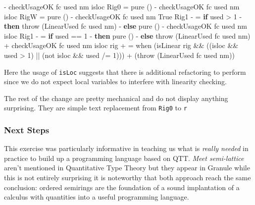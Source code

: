 \documentclass[
]{article}
\newenvironment{Shaded}{}{}
\newcommand{\DataTypeTok}[1]{\textcolor[rgb]{0.56,0.13,0.00}{#1}}
\newcommand{\DecValTok}[1]{\textcolor[rgb]{0.25,0.63,0.44}{#1}}
\newcommand{\FunctionTok}[1]{\textcolor[rgb]{0.02,0.16,0.49}{#1}}
\newcommand{\KeywordTok}[1]{\textcolor[rgb]{0.00,0.44,0.13}{\textbf{#1}}}
\newcommand{\NormalTok}[1]{#1}
\newcommand{\OperatorTok}[1]{\textcolor[rgb]{0.40,0.40,0.40}{#1}}
\newcommand{\OtherTok}[1]{\textcolor[rgb]{0.00,0.44,0.13}{#1}}
\begin{document}
\begin{Shaded}
\begin{Highlighting}[]
\OperatorTok{{-}}\NormalTok{       checkUsageOK fc used nm isloc }\DataTypeTok{Rig0} \OtherTok{=} \FunctionTok{pure}\NormalTok{ ()}
\OperatorTok{{-}}\NormalTok{       checkUsageOK fc used nm isloc }\DataTypeTok{RigW} \OtherTok{=} \FunctionTok{pure}\NormalTok{ ()}
\OperatorTok{{-}}\NormalTok{       checkUsageOK fc used nm }\DataTypeTok{True} \DataTypeTok{Rig1}
\OperatorTok{{-}}           \OtherTok{=} \KeywordTok{if}\NormalTok{ used }\OperatorTok{\textgreater{}} \DecValTok{1}
\OperatorTok{{-}}                \KeywordTok{then}\NormalTok{ throw (}\DataTypeTok{LinearUsed}\NormalTok{ fc used nm)}
\OperatorTok{{-}}                \KeywordTok{else} \FunctionTok{pure}\NormalTok{ ()}
\OperatorTok{{-}}\NormalTok{       checkUsageOK fc used nm isloc }\DataTypeTok{Rig1}
\OperatorTok{{-}}           \OtherTok{=} \KeywordTok{if}\NormalTok{ used }\OperatorTok{==} \DecValTok{1}
\OperatorTok{{-}}                \KeywordTok{then} \FunctionTok{pure}\NormalTok{ ()}
\OperatorTok{{-}}                \KeywordTok{else}\NormalTok{ throw (}\DataTypeTok{LinearUsed}\NormalTok{ fc used nm)}
\OperatorTok{+}\NormalTok{       checkUsageOK fc used nm isloc rig}
\OperatorTok{+}           \OtherTok{=}\NormalTok{ when (isLinear rig }\OperatorTok{\&\&}\NormalTok{ ((isloc }\OperatorTok{\&\&}\NormalTok{ used }\OperatorTok{\textgreater{}} \DecValTok{1}\NormalTok{) }\OperatorTok{||}\NormalTok{ (}\FunctionTok{not}\NormalTok{ isloc }\OperatorTok{\&\&}\NormalTok{ used }\OperatorTok{/=} \DecValTok{1}\NormalTok{)))}
\OperatorTok{+}\NormalTok{                  (throw (}\DataTypeTok{LinearUsed}\NormalTok{ fc used nm))}
\end{Highlighting}
\end{Shaded}

Here the usage of \texttt{isLoc} suggests that there is additional
refactoring to perform since we do not expect local variables to
interfere with linearity checking.

The rest of the change are pretty mechanical and do not display anything
surprising. They are simple text replacement from \texttt{Rig0} to
\texttt{r}

\hypertarget{next-steps}{%
\subsubsection{Next Steps}\label{next-steps}}

This exercise was particularly informative in teaching us what is
\emph{really needed} in practice to build up a programming language
based on QTT. \emph{Meet semi-lattice} aren't mentioned in Quantitative
Type Theory\cite{qtt} but they appear in Granule \cite{granule} while
this is not entirely surprising it is noteworthy that both approach
reach the same conclusion: ordered semirings are the foundation of a
sound implantation of a calculus with quantities into a useful
programming language.
\end{document}

